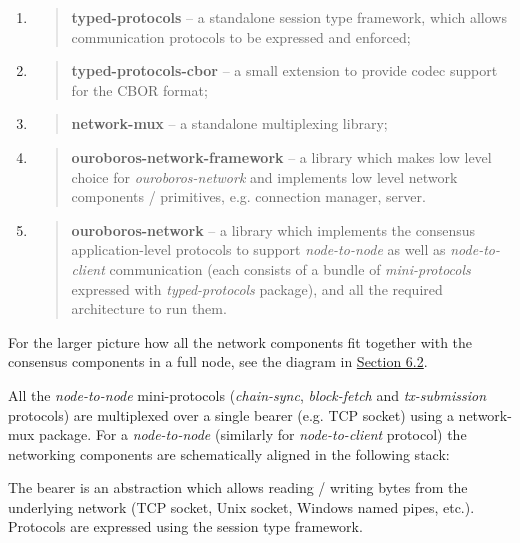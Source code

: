 \documentclass[]{article}
\begin{document}
\begin{enumerate}
\def\labelenumi{\arabic{enumi}.}
\item
  \begin{quote}
  \textbf{typed-protocols} -- a standalone session type framework, which
  allows communication protocols to be expressed and enforced;
  \end{quote}
\item
  \begin{quote}
  \textbf{typed-protocols-cbor} -- a small extension to provide codec
  support for the CBOR format;
  \end{quote}
\item
  \begin{quote}
  \textbf{network-mux} -- a standalone multiplexing library;
  \end{quote}
\item
  \begin{quote}
  \textbf{ouroboros-network-framework} -- a library which makes low
  level choice for \emph{ouroboros-network} and implements low level
  network components / primitives, e.g. connection manager, server.
  \end{quote}
\item
  \begin{quote}
  \textbf{ouroboros-network} -- a library which implements the consensus
  application-level protocols to support \emph{node-to-node} as well as
  \emph{node-to-client} communication (each consists of a bundle of
  \emph{mini-protocols} expressed with \emph{typed-protocols} package),
  and all the required architecture to run them.
  \end{quote}
\end{enumerate}

For the larger picture how all the network components fit together with
the consensus components in a full node, see the diagram in
\protect\hyperlink{consensus-components}{{Section 6.2}}.

All the \emph{node-to-node} mini-protocols (\emph{chain-sync},
\emph{block-fetch} and \emph{tx-submission} protocols) are multiplexed
over a single bearer (e.g. TCP socket) using a network-mux package. For
a \emph{node-to-node} (similarly for \emph{node-to-client} protocol) the
networking components are schematically aligned in the following stack:

The bearer is an abstraction which allows reading / writing bytes from
the underlying network (TCP socket, Unix socket, Windows named pipes,
etc.). Protocols are expressed using the session type framework.
\end{document}
